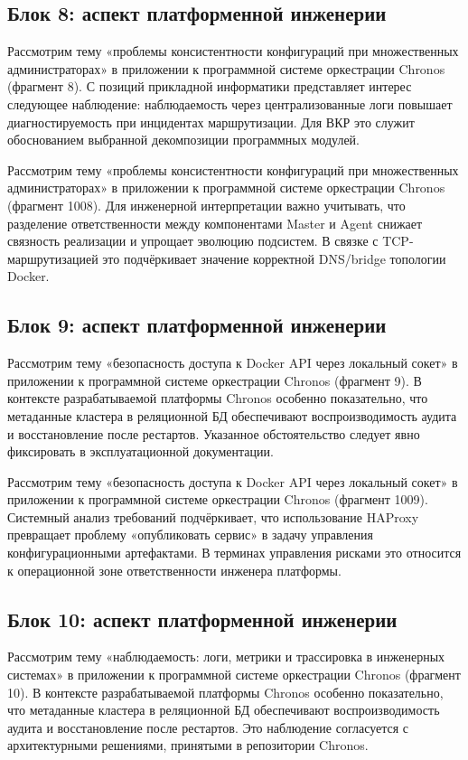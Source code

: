 \subsection{Блок 8: аспект платформенной инженерии}
 Рассмотрим тему «проблемы консистентности конфигураций при множественных администраторах» в приложении к программной системе оркестрации Chronos (фрагмент 8). С позиций прикладной информатики представляет интерес следующее наблюдение: наблюдаемость через централизованные логи повышает диагностируемость при инцидентах маршрутизации. Для ВКР это служит обоснованием выбранной декомпозиции программных модулей.

 Рассмотрим тему «проблемы консистентности конфигураций при множественных администраторах» в приложении к программной системе оркестрации Chronos (фрагмент 1008). Для инженерной интерпретации важно учитывать, что разделение ответственности между компонентами Master и Agent снижает связность реализации и упрощает эволюцию подсистем. В связке с TCP-маршрутизацией это подчёркивает значение корректной DNS/bridge топологии Docker.

\subsection{Блок 9: аспект платформенной инженерии}
 Рассмотрим тему «безопасность доступа к Docker API через локальный сокет» в приложении к программной системе оркестрации Chronos (фрагмент 9). В контексте разрабатываемой платформы Chronos особенно показательно, что метаданные кластера в реляционной БД обеспечивают воспроизводимость аудита и восстановление после рестартов. Указанное обстоятельство следует явно фиксировать в эксплуатационной документации.

 Рассмотрим тему «безопасность доступа к Docker API через локальный сокет» в приложении к программной системе оркестрации Chronos (фрагмент 1009). Системный анализ требований подчёркивает, что использование HAProxy превращает проблему «опубликовать сервис» в задачу управления конфигурационными артефактами. В терминах управления рисками это относится к операционной зоне ответственности инженера платформы.

\subsection{Блок 10: аспект платформенной инженерии}
 Рассмотрим тему «наблюдаемость: логи, метрики и трассировка в инженерных системах» в приложении к программной системе оркестрации Chronos (фрагмент 10). В контексте разрабатываемой платформы Chronos особенно показательно, что метаданные кластера в реляционной БД обеспечивают воспроизводимость аудита и восстановление после рестартов. Это наблюдение согласуется с архитектурными решениями, принятыми в репозитории Chronos.

